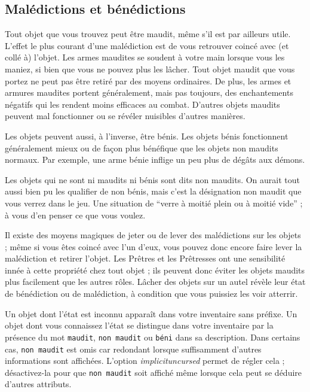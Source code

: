 \documentclass[titlepage]{article}
\begin{document}
\subsection*{Malédictions et bénédictions}

Tout objet que vous trouvez peut être maudit, même s'il est
par ailleurs utile.  L'effet le plus courant d'une malédiction est de vous
retrouver coincé avec (et collé à) l'objet.  Les armes maudites se soudent à votre
main lorsque vous les maniez, si bien que vous ne pouvez plus les lâcher.  Tout objet
maudit que vous portez ne peut pas être retiré par des moyens ordinaires.  De plus,
les armes et armures maudites portent généralement, mais pas toujours, des
enchantements négatifs qui les rendent moins efficaces au combat.  D'autres objets
maudits peuvent mal fonctionner ou se révéler nuisibles d'autres manières.

Les objets peuvent aussi, à l'inverse, être bénis.
Les objets bénis fonctionnent généralement mieux ou de façon plus bénéfique que
les objets non maudits normaux.
Par exemple, une arme bénie inflige un peu plus de dégâts aux démons.

Les objets qui ne sont ni maudits ni bénis sont dits non maudits.
On aurait tout aussi bien pu les qualifier de non bénis, mais c'est
la désignation non maudit que vous verrez dans le jeu.  Une situation de ``verre
à moitié plein ou à moitié vide'' ; à vous d'en penser ce que vous voulez.

Il existe des moyens magiques de jeter ou de lever des malédictions sur les objets ;
même si vous êtes coincé avec l'un d'eux, vous pouvez donc encore faire lever
la malédiction et retirer l'objet.
Les Prêtres et les Prêtresses ont une
sensibilité innée à cette propriété chez tout objet ; ils peuvent donc éviter les
objets maudits plus facilement que les autres rôles.
Lâcher des objets sur un autel révèle leur état de bénédiction ou de malédiction,
à condition que vous puissiez les voir atterrir.

Un objet dont l'état est inconnu apparaît dans votre inventaire sans préfixe.
Un objet dont vous connaissez l'état se distingue dans votre inventaire
par la présence du mot \texttt{maudit}, \texttt{non maudit} ou
\texttt{béni} dans sa description.
Dans certains cas, \texttt{non maudit} est omis car redondant lorsque
suffisamment d'autres informations sont affichées.
L'option
\textit{implicit\textunderscore uncursed}
permet de régler cela ; désactivez-la pour que \texttt{non maudit}
soit affiché même lorsque cela peut se déduire d'autres attributs.
\end{document}
